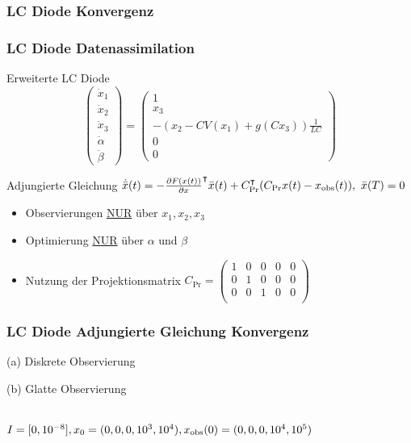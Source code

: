 \begin{frame}[<+->]
\frametitle{LC Diode Konvergenz}
\centering
\scalebox{0.9}{ }
\end{frame}

\begin{frame}[<+->]
\frametitle{LC Diode Datenassimilation}
\centering
\begin{block}{Erweiterte LC Diode} 
\[
 \begin{pmatrix}
  \dot x_1\\
  \dot x_2\\
  \dot x_3\\
  \dot \alpha\\
  \dot \beta
 \end{pmatrix}
 = 
 \begin{pmatrix}
  1\\
  x_3\\
  -\left(x_2-CV(x_1) + g(Cx_3)\right)\frac{1}{LC}\\
  0\\
  0
 \end{pmatrix}
\]
\end{block}
\begin{block}{Adjungierte Gleichung}
\centering
  $\dot{ \bar{x}}(t) =  -\frac{\partial F(x(t))}{\partial x}^\intercal \bar x(t) +C_{\text{Pr}}^\intercal(C_{\text{Pr}}x(t) - x_{\text{obs}}(t)), ~ \bar x(T) =0$
\end{block}

\begin{itemize}
 \item Observierungen \underline{NUR} über $x_1,x_2,x_3$
 \item Optimierung \underline{NUR} über $\alpha$ und $\beta$
 \item \vspace*{-0.45cm} Nutzung der Projektionsmatrix $C_{\text{Pr}}=
 \begin{pmatrix}
  1 &0 &0 &0 &0  \\
  0 &1 &0 &0 &0  \\
  0 &0 &1 &0 &0  \\
 \end{pmatrix}
$
\end{itemize}
\end{frame}

\begin{frame}[<+->]
\frametitle{LC Diode Adjungierte Gleichung Konvergenz}
\begin{minipage}{0.45\linewidth}
\centering
 
 (a) Diskrete Observierung
\end{minipage}
\begin{minipage}{0.45\linewidth}
\centering
 
(b) Glatte Observierung
 \end{minipage}
 \centering
 \\[0.3cm]
  $I=[0,10^{-8}],x_0=(0,0,0,10^3,10^{4}),x_\text{obs}(0)=(0,0,0,10^4,10^5)$
\end{frame}


